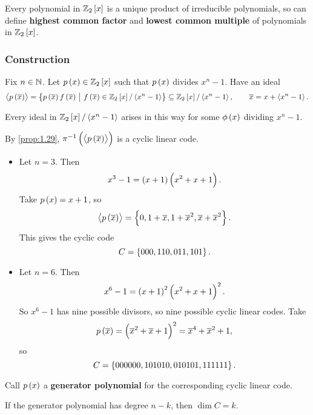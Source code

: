\begin{fact*}
Every polynomial in $ \ZZ_2\sbr{x} $ is a unique product of irreducible polynomials, so can define \textbf{highest common factor} and \textbf{lowest common multiple} of polynomials in $ \ZZ_2\sbr{x} $.
\end{fact*}

\subsubsection{Construction}

Fix $ n \in \mathbb{N} $. Let $ p\br{x} \in \ZZ_2\sbr{x} $ such that $ p\br{x} $ divides $ x^n - 1 $. Have an ideal
$$ \abr{p\br{\overline{x}}} = \cbr{p\br{\overline{x}}f\br{\overline{x}} \st f\br{\overline{x}} \in \ZZ_2\sbr{x} / \abr{x^n - 1}} \subseteq \ZZ_2\sbr{x} / \abr{x^n - 1}, \qquad \overline{x} = x + \abr{x^n - 1}. $$

\begin{fact*}
Every ideal in $ \ZZ_2\sbr{x} / \abr{x^n - 1} $ arises in this way for some $ \phi\br{x} $ dividing $ x^n - 1 $.
\end{fact*}

By \ref{prop:1.29}, $ \pi^{-1}\br{\abr{p\br{\overline{x}}}} $ is a cyclic linear code.

\begin{example*}
\hfill
\begin{itemize}
\item Let $ n = 3 $. Then
$$ x^3 - 1 = \br{x + 1}\br{x^2 + x + 1}. $$
Take $ p\br{x} = x + 1 $, so
$$ \abr{p\br{\overline{x}}} = \cbr{0, 1 + \overline{x}, 1 + \overline{x}^2, \overline{x} + \overline{x}^2}. $$
This gives the cyclic code
$$ C = \cbr{000, 110, 011, 101}. $$
\item Let $ n = 6 $. Then
$$ x^6 - 1 = \br{x + 1}^2\br{x^2 + x + 1}^2. $$
So $ x^6 - 1 $ has nine possible divisors, so nine possible cyclic linear codes. Take
$$ p\br{\overline{x}} = \br{\overline{x}^2 + \overline{x} + 1}^2 = \overline{x}^4 + \overline{x}^2 + 1, $$
so
$$ C = \cbr{000000, 101010, 010101, 111111}. $$
\end{itemize}
\end{example*}

\begin{definition*}
Call $ p\br{x} $ a \textbf{generator polynomial} for the corresponding cyclic linear code.
\end{definition*}

\begin{proposition}
If the generator polynomial has degree $ n - k $, then $ \dim C = k $.
\end{proposition}


